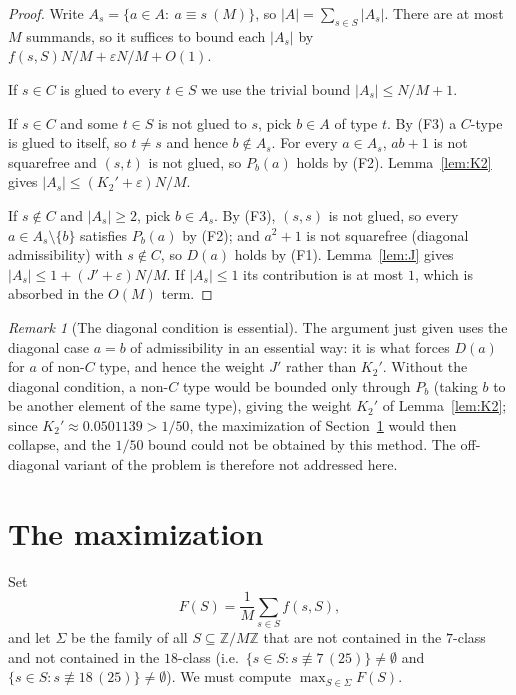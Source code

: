 \documentclass[11pt,a4paper]{article}
\theoremstyle{plain}
\theoremstyle{definition}
\theoremstyle{remark}
\newtheorem{remark}[theorem]{Remark}
\newcommand{\Z}{\mathbb{Z}}
\begin{document}
\begin{proof}
Write $A_s=\{a\in A:\ a\equiv s\ (M)\}$, so $|A|=\sum_{s\in S}|A_s|$. There are at most $M$ summands,
so it suffices to bound each $|A_s|$ by $f(s,S)N/M+\varepsilon N/M+O(1)$.

If $s\in C$ is glued to every $t\in S$ we use the trivial bound $|A_s|\le N/M+1$.

If $s\in C$ and some $t\in S$ is not glued to $s$, pick $b\in A$ of type $t$. By (F3) a $C$-type is
glued to itself, so $t\ne s$ and hence $b\notin A_s$. For every $a\in A_s$, $ab+1$ is not squarefree
and $(s,t)$ is not glued, so $P_b(a)$ holds by (F2). Lemma~\ref{lem:K2} gives
$|A_s|\le (K_2'+\varepsilon)N/M$.

If $s\notin C$ and $|A_s|\ge 2$, pick $b\in A_s$. By (F3), $(s,s)$ is not glued, so every
$a\in A_s\setminus\{b\}$ satisfies $P_b(a)$ by (F2); and $a^2+1$ is not squarefree (diagonal
admissibility) with $s\notin C$, so $D(a)$ holds by (F1). Lemma~\ref{lem:J} gives
$|A_s|\le 1+(J'+\varepsilon)N/M$. If $|A_s|\le 1$ its contribution is at most $1$, which is absorbed in
the $O(M)$ term.
\end{proof}

\begin{remark}[The diagonal condition is essential]\label{rem:diagonal}
The argument just given uses the diagonal case $a=b$ of admissibility in an essential way: it is
what forces $D(a)$ for $a$ of non-$C$ type, and hence the weight $J'$ rather than $K_2'$. Without
the diagonal condition, a non-$C$ type would be bounded only through $P_b$ (taking $b$ to be another
element of the same type), giving the weight $K_2'$ of Lemma~\ref{lem:K2}; since
$K_2'\approx 0.0501139>1/50$, the maximization of Section~\ref{sec:opt} would then collapse, and
the $1/50$ bound could not be obtained by this method. The off-diagonal variant of the problem is
therefore not addressed here.
\end{remark}

\section{The maximization}\label{sec:opt}

Set
\[
 F(S)=\frac{1}{M}\sum_{s\in S}f(s,S),
\]
and let $\Sigma$ be the family of all $S\subseteq\Z/M\Z$ that are not contained in the $7$-class and
not contained in the $18$-class (i.e.\ $\{s\in S: s\not\equiv 7\,(25)\}\ne\emptyset$ and
$\{s\in S: s\not\equiv 18\,(25)\}\ne\emptyset$). We must compute $\max_{S\in\Sigma}F(S)$.
\end{document}
